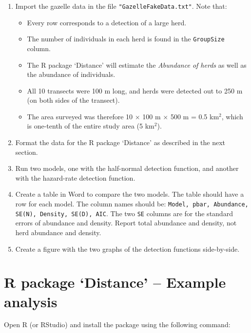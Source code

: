 \documentclass[12pt]{article}\usepackage[]{graphicx}\usepackage[]{color}
\newcommand{\inr}[1]{\colorbox{inlinecolor}{\texttt{#1}}}
\begin{document}
\begin{enumerate}
  \item Import the gazelle data in the file
    \verb+"GazelleFakeData.txt"+. Note that:
    \begin{itemize}
      \item Every row corresponds to a detection of a large herd.
      \item The number of individuals in each herd is found in
        the \inr{GroupSize} column. 
      \item The R package `Distance' will estimate the
        \textit{Abundance of herds} as well as the abundance of
        individuals.
      \item All 10 transects were 100 m long, and herds were detected
        out to 250 m (on both sides of the transect).
      \item The area surveyed was therefore
        10 $\times$ 100 m $\times$ 500 m = 0.5 km$^2$,
        which is one-tenth of the entire study area (5 km$^2$).
    \end{itemize}
  \item Format the data for the R package `Distance' as described in
    the next section.  
  \item Run two models, one with the half-normal detection function,
    and another with the hazard-rate detection function.
  \item Create a table in Word to compare the two models. The table
    should have a row for each model. The column names should be:
    \texttt{Model, pbar, Abundance, SE(N), Density, SE(D), AIC}.
    The two \verb+SE+ columns are for the standard errors of
    abundance and density. Report total abundance and density, not
    herd abundance and density.
  \item Create a figure with the two graphs of the detection functions
    side-by-side.
\end{enumerate}



\clearpage




\section*{R package `Distance' -- Example analysis}

Open R (or RStudio) and install the package using the following
command:
\end{document}
